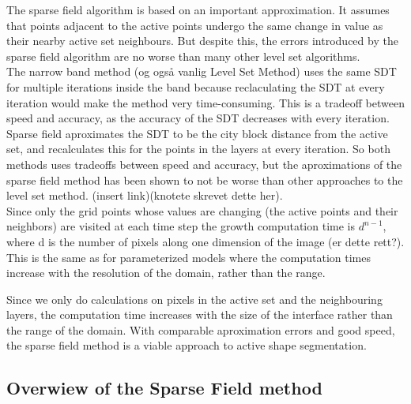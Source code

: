 The sparse field algorithm is based on an important approximation. It assumes that points adjacent to the active points undergo the same change in value as their nearby active set neighbours. But despite this, the errors introduced by the sparse field algorithm are no worse than many other level set algorithms.\\ 

The narrow band method (og også vanlig Level Set Method) uses the same SDT for multiple iterations inside the band because reclaculating the SDT at every iteration would make the method very time-consuming. This is a tradeoff between speed and accuracy, as the accuracy of the SDT decreases with every iteration. Sparse field aproximates the SDT to be the city block distance from the active set, and recalculates this for the points in the layers at every iteration. So both methods uses tradeoffs between speed and accuracy, but the aproximations of the sparse field method has been shown to not be worse than other approaches to the level set method. (insert link)(knotete skrevet dette her).\\


Since only the grid points whose values are changing (the active points and their neighbors) are visited at each time step the growth computation time is \(d^{n-1}\), where d is the number of pixels along one dimension of the image (er dette rett?). This is the same as for parameterized models where the computation times increase with the resolution of the domain, rather than the range. 

Since we only do calculations on pixels in the active set and the neighbouring layers, the computation time increases with the size of the interface rather than the range of the domain. With comparable aproximation errors and good speed, the sparse field method is a viable approach to active shape segmentation.




\subsection{Overwiew of the Sparse Field method}

